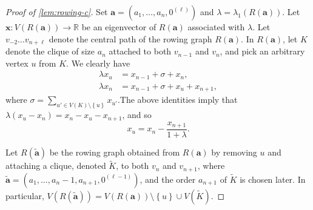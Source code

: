 \documentclass[11pt]{article}
\theoremstyle{definition}
\theoremstyle{remark}
\newcommand{\sset}[1]{\left\{{#1}\right\}}
\newcommand{\la}{\lambda}
\newcommand{\R}{\mathbb{R}}
\newcommand{\ba}{\bm{a}}
\newcommand{\tba}{\tilde{\ba}}
\newcommand{\bx}{\bm{x}}
\begin{document}
\begin{proof}[Proof of \ref{lem:rowing-c}]
    Set $\ba = (a_1, \dots, a_n, 0^{(\ell)})$ and $\la = \la_1(R(\ba))$. Let $\bx\colon V(R(\ba)) \to \R$ be an eigenvector of $R(\ba)$ associated with $\la$. Let $v_{-2}\dots v_{n + \ell}$ denote the central path of the rowing graph $R(\ba)$. In $R(\ba)$, let $K$ denote the clique of size $a_n$ attached to both $v_{n-1}$ and $v_n$, and pick an arbitrary vertex $u$ from $K$. We clearly have
    \begin{equation} \label{eqn:rowing-c-0}
        \begin{split}
            \la x_u & = x_{n-1} + \sigma + x_n, \\
            \la x_n & = x_{n-1} + \sigma + x_u + x_{n+1},
        \end{split}
    \end{equation}
    where $\sigma = \sum_{u' \in V(K) \setminus \sset{u}} x_{u'}$.The above identities imply that $\la(x_u - x_n) = x_n - x_u - x_{n+1}$, and so
    \begin{equation} \label{eqn:rowing-c-1}
        x_u = x_n - \frac{x_{n+1}}{1 + \la}.
    \end{equation}
    
    Let $R(\tba)$ be the rowing graph obtained from $R(\ba)$ by removing $u$ and attaching a clique, denoted $\tilde{K}$, to both $v_n$ and $v_{n+1}$, where $\tba = (a_1, \dots, a_n-1,a_{n+1},0^{(\ell-1)})$, and the order $a_{n+1}$ of $\tilde{K}$ is chosen later. In particular, $V(R(\tba)) = V(R(\ba)) \setminus \sset{u} \cup V(\tilde{K})$.
    

\end{proof}
\end{document}

